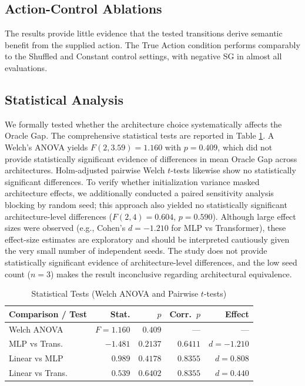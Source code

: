 \documentclass[conference]{IEEEtran}
\begin{document}
\subsection{Action-Control Ablations}
The results provide little evidence that the tested transitions derive semantic benefit from the supplied action. The True Action condition performs comparably to the Shuffled and Constant control settings, with negative SG in almost all evaluations.

\subsection{Statistical Analysis}
We formally tested whether the architecture choice systematically affects the Oracle Gap. The comprehensive statistical tests are reported in Table \ref{tab:stats}. A Welch's ANOVA yields $F(2,3.59)=1.160$ with $p=0.409$, which did not provide statistically significant evidence of differences in mean Oracle Gap across architectures. Holm-adjusted pairwise Welch $t$-tests likewise show no statistically significant differences. To verify whether initialization variance masked architecture effects, we additionally conducted a paired sensitivity analysis blocking by random seed; this approach also yielded no statistically significant architecture-level differences ($F(2,4)=0.604$, $p=0.590$). Although large effect sizes were observed (e.g., Cohen's $d = -1.210$ for MLP vs Transformer), these effect-size estimates are exploratory and should be interpreted cautiously given the very small number of independent seeds. The study does not provide statistically significant evidence of architecture-level differences, and the low seed count ($n=3$) makes the result inconclusive regarding architectural equivalence.

\begin{table}[t]
\centering
\caption{Statistical Tests (Welch ANOVA and Pairwise $t$-tests)}
\label{tab:stats}
\small
\setlength{\tabcolsep}{3.5pt}
\begin{tabular}{@{}lrrrr@{}}
\toprule
Comparison / Test & Stat. & $p$ & Corr.\ $p$ & Effect \\
\midrule
Welch ANOVA & $F{=}1.160$ & $0.409$ & --- & --- \\
MLP vs Trans. & $-1.481$ & $0.2137$ & $0.6411$ & $d{=}{-}1.210$ \\
Linear vs MLP & $0.989$ & $0.4178$ & $0.8355$ & $d{=}0.808$ \\
Linear vs Trans. & $0.539$ & $0.6402$ & $0.8355$ & $d{=}0.440$ \\
\bottomrule
\end{tabular}
\end{table}
\end{document}
